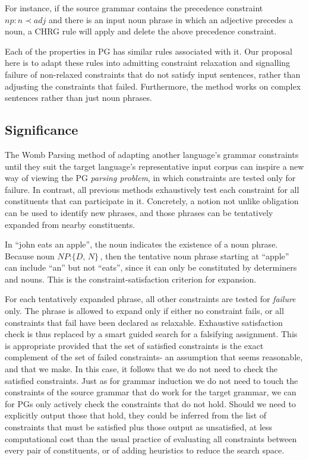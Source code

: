 \documentclass{llncs}
\newcommand{\constituency}[2]{\textit{#1} : \textit{#2}}
\newcommand{\precedence}[3]{\textit{#1} : \textit{#2} \prec \textit{#3}}
\begin{document}
For instance, if the source grammar contains the precedence constraint $\precedence{np}{n}{adj}$
and there is an input noun phrase in which an adjective precedes a noun, a CHRG rule will apply and delete the above precedence constraint.

Each of the properties in PG has similar rules associated with it. Our proposal here is to adapt these rules into admitting constraint relaxation and signalling failure of non-relaxed constraints that do not satisfy input sentences, rather than adjusting the constraints that failed. Furthermore, the method works on complex sentences rather than just noun phrases.

\subsection{Significance}

The Womb Parsing method of adapting another language's grammar constraints  until they suit the target language's representative input corpus can inspire a new way of viewing the PG \emph{parsing problem}, in which  constraints are tested only for failure. In contrast, all previous methods exhaustively test each constraint for all constituents that can participate in it. Concretely, a notion  not unlike obligation can be used to identify new phrases, and those phrases can be tentatively expanded from nearby constituents.

\begin{example}In ``john eats an apple'', the noun indicates the existence of a noun phrase. Because noun $\constituency{NP}{\{D, N\}}$, then the tentative noun phrase starting at ``apple'' can include ``an'' but not ``eats'', since it can only be constituted by determiners and nouns. This is the constraint-satisfaction criterion for expansion.
\end{example}

For each tentatively expanded phrase, all other constraints are tested for \emph{failure} only. The phrase is allowed to expand only if either no constraint fails, or all constraints that fail have been declared as relaxable. Exhaustive satisfaction check is thus replaced by a smart guided search for a falsifying assignment. This is appropriate provided that  the set of satisfied constraints is the exact complement of the set of failed constraints- an assumption that seems reasonable, and that we make. In this case, it follows that we do not need to check the satisfied constraints.  Just as for grammar induction we do not need to touch the constraints of the source grammar that do work for the target grammar,  we can for PGs  only actively check  the constraints that do not hold. Should we need to explicitly output those that hold, they could be inferred  from the list of constraints that must be satisfied plus those output as unsatisfied, at less computational cost than the usual practice of evaluating  all constraints between every pair of constituents, or of adding heuristics to reduce the search space.
\end{document}
